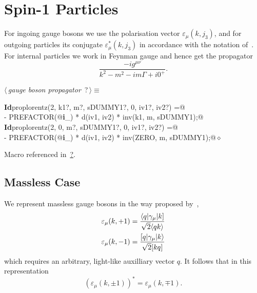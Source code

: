 \documentclass[a4paper,12pt]{amsart}
\newcommand{\Spaa}[1]{\langle #1 \rangle}
\newcommand{\Spab}[1]{\langle #1]}
\newcommand{\Spba}[1]{[ #1 \rangle}
\newcommand{\Spbb}[1]{[ #1 ]}
\renewcommand{\NWtarget}[2]{\hypertarget{#1}{#2}}
\renewcommand{\NWlink}[2]{\hyperlink{#1}{#2}}
\renewcommand{\NWtxtMacroRefIn}{Macro referenced in}
\renewcommand{\NWsep}{${\diamond}$}
\begin{document}
\section{Spin-1 Particles}
For ingoing gauge bosons we use the polarisation vector
$\varepsilon_\mu(k, j_3)$, and for outgoing particles its
conjugate $\varepsilon_\mu^\ast(k, j_3)$ in accordance with the
notation of~\cite{1}. For internal particles we work in Feynman gauge
and hence get the propagator
\begin{equation}
\frac{-ig^{\mu\nu}}{k^2-m^2-im\Gamma+i0^+}\text{.}
\end{equation}
\begin{flushleft} \small
\begin{minipage}{\linewidth}\label{scrap18}\raggedright\small
\NWtarget{nuweb?}{} $\langle\,${\it gauge boson propagator}\nobreak\ {\footnotesize {?}}$\,\rangle\equiv$
\vspace{-1ex}
\begin{list}{}{} \item
\mbox{}\verb@@\hbox{\sffamily\bfseries Id}\verb@ proplorentz(2, k1?, m?, sDUMMY1?, 0, iv1?, iv2?) =@\\
\mbox{}\verb@   - PREFACTOR(@\hbox{\sffamily\bfseries i}\verb@_) * d(iv1, iv2) * inv(k1, m, sDUMMY1);@\\
\mbox{}\verb@@\hbox{\sffamily\bfseries Id}\verb@ proplorentz(2, 0, m?, sDUMMY1?, 0, iv1?, iv2?) =@\\
\mbox{}\verb@   - PREFACTOR(@\hbox{\sffamily\bfseries i}\verb@_) * d(iv1, iv2) * inv(ZERO, m, sDUMMY1);@{\NWsep}
\end{list}
\vspace{-1.5ex}
\footnotesize
\begin{list}{}{\setlength{\itemsep}{-\parsep}\setlength{\itemindent}{-\leftmargin}}
\item \NWtxtMacroRefIn\ \NWlink{nuweb?}{?}.

\item{}
\end{list}
\end{minipage}\vspace{4ex}
\end{flushleft}
\subsection{Massless Case}
We represent massless gauge bosons in the way proposed by~\cite{Xu},
\begin{align}
\varepsilon_\mu(k, +1) &= \frac{\Spab{q\vert\gamma_\mu\vert k}}{%
   \sqrt{2}\Spaa{qk}}\\
\varepsilon_\mu(k, -1) &= \frac{\Spba{q\vert\gamma_\mu\vert k}}{%
   \sqrt{2}\Spbb{kq}}
\end{align}
which requires an arbitrary, light-like auxilliary vector $q$. It
follows that in this representation
\begin{equation}\label{eq:polarisation-conjugate}
\left(\varepsilon_\mu(k,\pm1)\right)^\ast = \varepsilon_\mu(k,\mp1)\text{.}
\end{equation}
\end{document}
